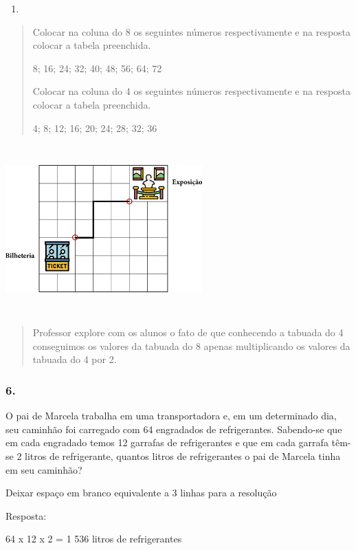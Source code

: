 \begin{enumerate}
\def\labelenumi{\alph{enumi})}
\item
\end{enumerate}

\begin{quote}
Colocar na coluna do 8 os seguintes números respectivamente e na
resposta colocar a tabela preenchida.

8; 16; 24; 32; 40; 48; 56; 64; 72

Colocar na coluna do 4 os seguintes números respectivamente e na
resposta colocar a tabela preenchida.

4; 8; 12; 16; 20; 24; 28; 32; 36
\end{quote}

\includegraphics[width=2.98333in,height=2.55714in]{media/image35.png}

\begin{quote}
Professor explore com os alunos o fato de que conhecendo a tabuada do 4
conseguimos os valores da tabuada do 8 apenas multiplicando os valores
da tabuada do 4 por 2.
\end{quote}

\subsubsection{6.}\label{section-18}

O pai de Marcela trabalha em uma transportadora e, em um determinado
dia, seu caminhão foi carregado com 64 engradados de refrigerantes.
Sabendo-se que em cada engradado temos 12 garrafas de refrigerantes e
que em cada garrafa têm-se 2 litros de refrigerante, quantos litros de
refrigerantes o pai de Marcela tinha em seu caminhão?

Deixar espaço em branco equivalente a 3 linhas para a resolução

Resposta:

64 x 12 x 2 = 1 536 litros de refrigerantes

